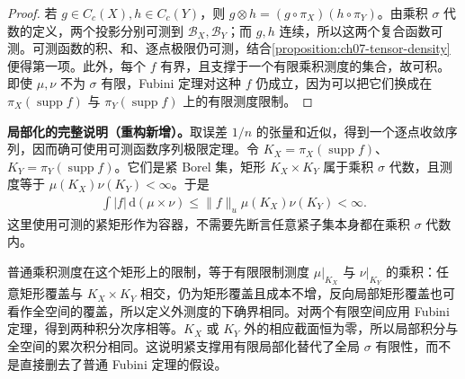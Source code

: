 \documentclass[../../main.tex]{subfiles}
\begin{document}
\begin{proof}
若 $g\in C_c(X),h\in C_c(Y)$，则 $g\otimes h=(g\circ\pi_X)(h\circ\pi_Y)$。由乘积 $\sigma$ 代数的定义，两个投影分别可测到 $\mathscr B_X,\mathscr B_Y$；而 $g,h$ 连续，所以这两个复合函数可测。可测函数的积、和、逐点极限仍可测，结合\cref{proposition:ch07-tensor-density}便得第一项。此外，每个 $f$ 有界，且支撑于一个有限乘积测度的集合，故可积。即使 $\mu,\nu$ 不为 $\sigma$ 有限，Fubini 定理对这种 $f$ 仍成立，因为可以把它们换成在 $\pi_X(\operatorname{supp}f)$ 与 $\pi_Y(\operatorname{supp}f)$ 上的有限测度限制。
\end{proof}
\begin{remark}
\textbf{局部化的完整说明（重构新增）。}取误差 $1/n$ 的张量和近似，得到一个逐点收敛序列，因而确可使用可测函数序列极限定理。令 $K_X=\pi_X(\operatorname{supp}f)$、$K_Y=\pi_Y(\operatorname{supp}f)$。它们是紧 Borel 集，矩形 $K_X\times K_Y$ 属于乘积 $\sigma$ 代数，且测度等于 $\mu(K_X)\nu(K_Y)<\infty$。于是
\begin{align*}
\int|f|\,\mathrm d(\mu\times\nu)\leqslant\|f\|_u\mu(K_X)\nu(K_Y)<\infty.
\end{align*}
这里使用可测的紧矩形作为容器，不需要先断言任意紧子集本身都在乘积 $\sigma$ 代数内。

普通乘积测度在这个矩形上的限制，等于有限限制测度 $\mu|_{K_X}$ 与 $\nu|_{K_Y}$ 的乘积：任意矩形覆盖与 $K_X\times K_Y$ 相交，仍为矩形覆盖且成本不增，反向局部矩形覆盖也可看作全空间的覆盖，所以定义外测度的下确界相同。对两个有限空间应用 Fubini 定理，得到两种积分次序相等。$K_X$ 或 $K_Y$ 外的相应截面恒为零，所以局部积分与全空间的累次积分相同。这说明紧支撑用有限局部化替代了全局 $\sigma$ 有限性，而不是直接删去了普通 Fubini 定理的假设。
\end{remark}

\end{document}
